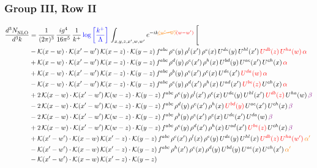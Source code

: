 \documentclass[9pt]{article}
\numberwithin{equation}{section}
\begin{document}
\subsubsection{Group III, Row II}
\begin{align}
     \frac{d^{3}N_{\rm NLO}^{\rm}}{d^{3}k}  & = \frac{1}{(2\pi)^{3}}\, \frac{ig^{4}}{16\pi^{5}}\, \frac{1}{k^{+}}\, {\color{blue}\log{\left[\frac{k^{+}}{\Lambda}\right]}}\,\int_{x,y,z,x^{\prime},w,w^{\prime}}e^{-ik{\color{orange}\cancel{(w^{\prime}-w)}}{\color{red}(w-w^{\prime})}}\, \Bigg[\notag \\ & -\mathcal{K}(x-w)\cdot \mathcal{K}(x'-w')\, \mathcal{K}(x-z)\cdot \mathcal{K}(y-z)\, f^{abc}\, \rho^{e}(y)\,\rho^{l}(x')\,\rho^{c}(x)\,U^{de}(y)\,U^{hl}(x')\,{\color{red}U^{db}(z)}\,{\color{red}U^{ha}(w)}\, {\color{red}\alpha} \notag \\ & +\mathcal{K}(x-w)\cdot \mathcal{K}(x'-w')\, \mathcal{K}(x-z)\cdot \mathcal{K}(y-z)\, f^{abc}\, \rho^{d}(y)\,\rho^{e}(x')\,\rho^{h}(x)\,U^{bd}(y)\,U^{ae}(x')\,U^{ch}(x)\, {\color{red}\alpha} \notag \\ & + \mathcal{K}(x-w)\cdot \mathcal{K}(x'-w')\, \mathcal{K}(x-z)\cdot \mathcal{K}(y-z)\, f^{abc}\, \rho^{b}(y)\,\rho^{e}(x')\,\rho^{c}(x)\,U^{de}(x')\,{\color{red}U^{da}(w)}\, {\color{red}\alpha} \notag \\ & -\mathcal{K}(x-w)\cdot \mathcal{K}(x'-w')\, \mathcal{K}(x-z)\cdot \mathcal{K}(y-z)\, f^{abc}\, \rho^{e}(y)\,\rho^{d}(x')\,\rho^{h}(x)\,U^{ad}(x')\,{\color{red}U^{be}(z)}\,U^{ch}(x)\, {\color{red}\alpha} \notag \\ & +2\, \mathcal{K}(x-w)\cdot \mathcal{K}(x'-w')\, \mathcal{K}(w-z) \cdot \mathcal{K}(y-z)\, f^{abc}\, \rho^{e}(y)\,\rho^{l}(x')\, \rho^{c}(x)\, U^{de}(y)\,U^{hl}(x')\,{\color{red}U^{db}(z)}\,U^{ha}(w)\, {\color{violet} \beta} \notag \\ & -2\, \mathcal{K}(x-w)\cdot \mathcal{K}(x'-w')\, \mathcal{K}(w-z) \cdot \mathcal{K}(y-z)\, f^{abc}\, \rho^{d}(y)\,\rho^{e}(x')\, \rho^{h}(x)\, {\color{red}U^{bd}(y)}\,U^{ae}(x')\,U^{ch}(x)\, {\color{violet} \beta}\notag \\ & -2\, \mathcal{K}(x-w)\cdot \mathcal{K}(x'-w')\, \mathcal{K}(w-z) \cdot \mathcal{K}(y-z)\, f^{abc}\, \rho^{b}(y)\,\rho^{e}(x')\, \rho^{c}(x)\, U^{de}(x')\,U^{da}(w)\, {\color{violet} \beta}\notag \\ & + 2\, \mathcal{K}(x-w)\cdot \mathcal{K}(x'-w')\, \mathcal{K}(w-z) \cdot \mathcal{K}(y-z)\, f^{abc}\, \rho^{e}(y)\,\rho^{d}(x')\, \rho^{h}(x)\, U^{ad}(x')\,{\color{red}U^{be}(z)}\,U^{ch}(x)\, {\color{violet} \beta}\notag \\ & +\mathcal{K}(x'-w')\cdot\mathcal{K}(x-w)\,\mathcal{K}(x'-z)\cdot\mathcal{K}(y-z)\, f^{abc}\,\rho^{c}(x')\,\rho^{l}(x)\,\rho^{e}(y)\,U^{de}(y)\,U^{hl}(x)\,{\color{red}U^{db}(z)}\,{\color{red}U^{ha}(w')}\,{\color{orange} \alpha'}\notag\\ & -\mathcal{K}(x'-w')\cdot\mathcal{K}(x-w)\,\mathcal{K}(x'-z)\cdot\mathcal{K}(y-z)\, f^{abc}\,\rho^{h}(x')\,\rho^{e}(x)\,\rho^{d}(y)\,U^{bd}(y)\,U^{ae}(x)\,U^{ch}(x')\,{\color{orange} \alpha'}\notag\\ &-\mathcal{K}(x'-w')\cdot\mathcal{K}(x-w)\,\mathcal{K}(x'-z)\cdot\mathcal{K}(y-z)\, 
\end{align}
\end{document}
